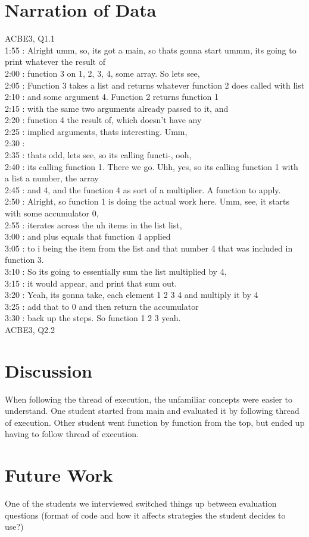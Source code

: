 \documentclass{article}
\begin{document}
\section{Narration of Data}
ACBE3, Q1.1 \\
1:55 : Alright umm, so, its got a main, so thats gonna start ummm, its going to print whatever the result of \\
2:00 : function 3 on 1, 2, 3, 4, some array. So lets see, \\
2:05 : Function 3 takes a list and returns whatever function  2 does called with list \\
2:10 : and some argument 4. Function 2 returns function 1 \\
2:15 : with the same two arguments already passed to it, and \\
2:20 : function 4 the result of, which doesn't have any \\
2:25 : implied arguments, thats interesting. Umm, \\
2:30 :  \\
2:35 : thats odd, lets see, so its calling functi-, ooh, \\
2:40 : its calling function 1. There we go. Uhh, yes, so its calling function 1 with a list a number, the array \\
2:45 : and 4, and the function 4 as sort of a multiplier. A function to apply. \\
2:50 : Alright, so function 1 is doing the actual work here. Umm, see, it starts with some accumulator 0,  \\
2:55 : iterates across the uh items in the list list, \\
3:00 : and plus equals that function 4 applied \\
3:05 : to i being the item from the list and that number 4 that was included in function 3. \\
3:10 : So its going to essentially sum the list multiplied by 4, \\
3:15 : it would appear, and print that sum out. \\
3:20 : Yeah, its gonna take, each element 1 2 3 4 and multiply it by 4 \\
3:25 : add that to 0 and then return the accumulator \\
3:30 : back up the steps. So function 1 2 3 yeah. \\


ACBE3, Q2.2 

\section{Discussion}
When following the thread of execution, the unfamiliar concepts were easier to understand. 
One student started from main and evaluated it by following thread of execution. Other student went function by function from the top, but ended up having to follow thread of execution. 

\section{Future Work}
One of the students we interviewed switched things up between evaluation questions (format of code and how it affects strategies the student decides to use?)
\end{document}
